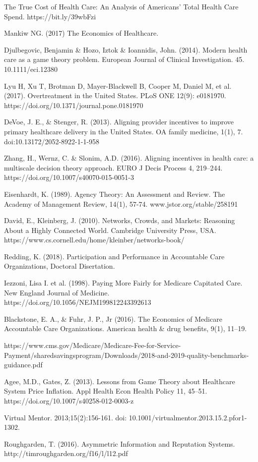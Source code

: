 \documentclass{article}
\begin{document}
\clearpage

\begin{thebibliography}{8}

The True Cost of Health Care: An Analysis of Americans’ Total Health Care Spend. https://bit.ly/39wbFzi

Mankiw NG. (2017) The Economics of Healthcare.

Djulbegovic, Benjamin \& Hozo, Iztok \& Ioannidis, John. (2014). Modern health care as a game theory problem. European Journal of Clinical Investigation. 45. 10.1111/eci.12380

Lyu H, Xu T, Brotman D, Mayer-Blackwell B, Cooper M, Daniel M, et al. (2017). Overtreatment in the United States. PLoS ONE 12(9): e0181970. https://doi.org/10.1371/journal.pone.0181970

DeVoe, J. E., \& Stenger, R. (2013). Aligning provider incentives to improve primary healthcare delivery in the United States. OA family medicine, 1(1), 7. doi:10.13172/2052-8922-1-1-958

Zhang, H., Wernz, C. \& Slonim, A.D. (2016). Aligning incentives in health care: a multiscale decision theory approach. EURO J Decis Process 4, 219–244. https://doi.org/10.1007/s40070-015-0051-3

Eisenhardt, K. (1989). Agency Theory: An Assessment and Review. The Academy of Management Review, 14(1), 57-74. www.jstor.org/stable/258191

David, E., Kleinberg, J. (2010). Networks, Crowds, and Markets: Reasoning About a Highly Connected World. Cambridge University Press, USA. https://www.cs.cornell.edu/home/kleinber/networks-book/

Redding, K. (2018). Participation and Performance in Accountable Care Organizations, Doctoral Disertation.

Iezzoni, Lisa I. et al. (1998). Paying More Fairly for Medicare Capitated Care. New England Journal of Medicine. https://doi.org/10.1056/NEJM199812243392613

Blackstone, E. A., \& Fuhr, J. P., Jr (2016). The Economics of Medicare Accountable Care Organizations. American health \& drug benefits, 9(1), 11–19.

https://www.cms.gov/Medicare/Medicare-Fee-for-Service-Payment/sharedsavingsprogram/Downloads\-/2018-and-2019-quality-benchmarks-guidance.pdf

Agee, M.D., Gates, Z. (2013). Lessons from Game Theory about Healthcare System Price Inflation. Appl Health Econ Health Policy 11, 45–51. https://doi.org/10.1007/s40258-012-0003-z

Virtual Mentor. 2013;15(2):156-161. doi: 10.1001/virtualmentor.2013.15.2.pfor1-1302.

Roughgarden, T. (2016). Asymmetric Information and Reputation Systems. http://timroughgarden.org/f16/l/l12.pdf

\end{thebibliography}

\end{document}
